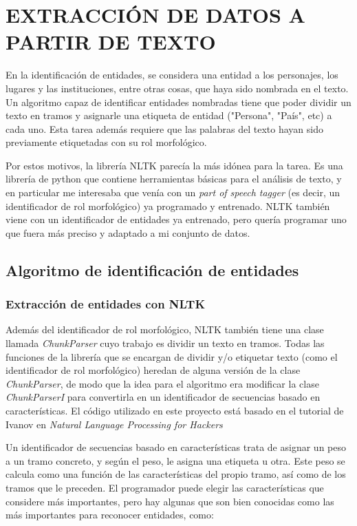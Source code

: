 \documentclass{pre-tfg}
\begin{document}
\section {EXTRACCIÓN DE DATOS A PARTIR DE TEXTO}

En la identificación de entidades, se considera una entidad a los personajes, los lugares y las instituciones, entre otras cosas, que haya sido nombrada en el texto. Un algoritmo capaz de identificar entidades nombradas tiene que poder dividir un texto en tramos y asignarle una etiqueta de entidad ("Persona", "País", etc) a cada uno. Esta tarea además requiere que las palabras del texto hayan sido previamente etiquetadas con su rol morfológico.

Por estos motivos, la librería NLTK parecía la más idónea para la tarea. Es una librería de python que contiene herramientas básicas para el análisis de texto, y en particular me interesaba que venía con un \textit{part of speech tagger} (es decir, un identificador de rol morfológico) ya programado y entrenado. NLTK también viene con un identificador de entidades ya entrenado, pero quería programar uno que fuera más preciso y adaptado a mi conjunto de datos.



\subsection{Algoritmo de identificación de entidades}

\subsubsection{Extracción de entidades con NLTK}
\label{sec:nerextract_tagger}
Además del identificador de rol morfológico, NLTK también tiene una clase llamada \textit{ChunkParser} cuyo trabajo es dividir un texto en tramos. Todas las funciones de la librería que se encargan de dividir y/o etiquetar texto (como el identificador de rol morfológico) heredan de alguna versión de la clase \textit{ChunkParser}, de modo que la idea para el algoritmo era modificar la clase \textit{ChunkParserI} para convertirla en un identificador de secuencias basado en características. El código utilizado en este proyecto está basado en el tutorial de Ivanov en \textit{Natural Language Processing for Hackers} \cite{ivanov_2016}

Un identificador de secuencias basado en características trata de asignar un peso a un tramo concreto, y según el peso, le asigna una etiqueta u otra. Este peso se calcula como una función de las características del propio tramo, así como de los tramos que le preceden.
El programador puede elegir las características que considere más importantes, pero hay algunas que son bien conocidas como las más importantes para reconocer entidades, como:
\end{document}
